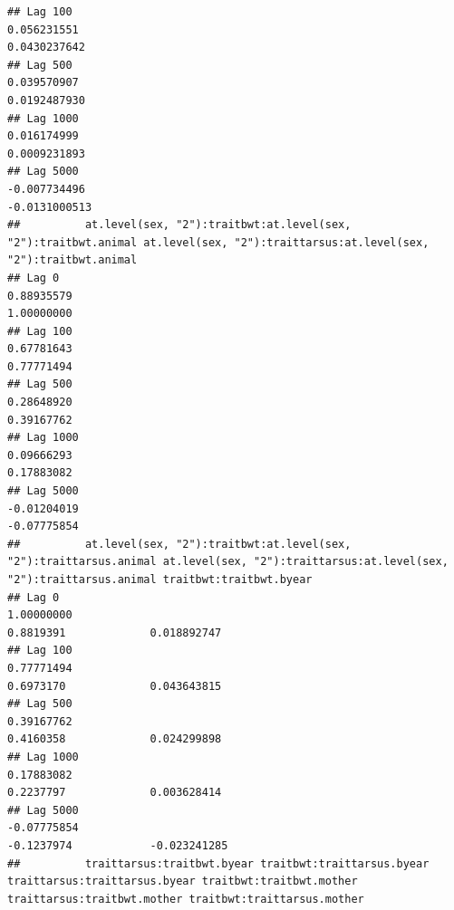 \documentclass[
  12pt,
]{book}
\begin{document}
\begin{verbatim}
## Lag 100                                                        0.056231551                                                         0.0430237642
## Lag 500                                                        0.039570907                                                         0.0192487930
## Lag 1000                                                       0.016174999                                                         0.0009231893
## Lag 5000                                                      -0.007734496                                                        -0.0131000513
##          at.level(sex, "2"):traitbwt:at.level(sex, "2"):traitbwt.animal at.level(sex, "2"):traittarsus:at.level(sex, "2"):traitbwt.animal
## Lag 0                                                        0.88935579                                                        1.00000000
## Lag 100                                                      0.67781643                                                        0.77771494
## Lag 500                                                      0.28648920                                                        0.39167762
## Lag 1000                                                     0.09666293                                                        0.17883082
## Lag 5000                                                    -0.01204019                                                       -0.07775854
##          at.level(sex, "2"):traitbwt:at.level(sex, "2"):traittarsus.animal at.level(sex, "2"):traittarsus:at.level(sex, "2"):traittarsus.animal traitbwt:traitbwt.byear
## Lag 0                                                           1.00000000                                                            0.8819391             0.018892747
## Lag 100                                                         0.77771494                                                            0.6973170             0.043643815
## Lag 500                                                         0.39167762                                                            0.4160358             0.024299898
## Lag 1000                                                        0.17883082                                                            0.2237797             0.003628414
## Lag 5000                                                       -0.07775854                                                           -0.1237974            -0.023241285
##          traittarsus:traitbwt.byear traitbwt:traittarsus.byear traittarsus:traittarsus.byear traitbwt:traitbwt.mother traittarsus:traitbwt.mother traitbwt:traittarsus.mother

\end{verbatim}
\end{document}
